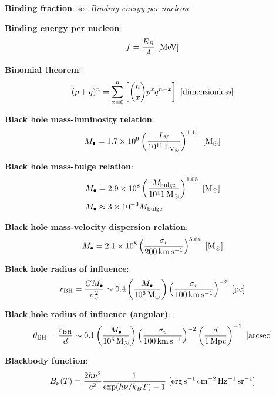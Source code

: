 \documentclass[a4paper,10pt]{article}
\begin{document}
{\noindent}\textbf{Binding fraction}: see \textit{Binding energy per nucleon}

{\noindent}\textbf{Binding energy per nucleon}:
\begin{align*}
    f = \frac{E_B}{A} ~ [{\rm MeV}]
\end{align*}

{\noindent}\textbf{Binomial theorem}:
\begin{align*}
    (p+q)^n = \sum _{x=0}^n \left[ \binom{n}{x}p^xq^{n-x} \right] ~ [{\rm dimensionless}]
\end{align*}

{\noindent}\textbf{Black hole mass-luminosity relation}:
\begin{align*}
    M_\bullet = 1.7\times10^9\left(\frac{L_\mathrm{V}}{10^{11}\,{\rm L_{V_\odot}}}\right)^{1.11} ~ [{\rm M_\odot}]
\end{align*}

{\noindent}\textbf{Black hole mass-bulge relation}:
\begin{align*}
    M_\bullet &= 2.9\times10^8\left(\frac{M_\mathrm{bulge}}{10^11\,{\rm M_\odot}}\right)^{1.05} ~ [{\rm M_\odot}] \\
    M_\bullet &\approx 3\times10^{-3}M_\mathrm{bulge}
\end{align*}

{\noindent}\textbf{Black hole mass-velocity dispersion relation}:
\begin{align*}
    M_\bullet = 2.1\times 10^8\left(\frac{\sigma_v}{200\,{\rm km\,s^{-1}}}\right)^{5.64} ~ [{\rm M_\odot}]
\end{align*}

{\noindent}\textbf{Black hole radius of influence}:
\begin{align*}
    r_\mathrm{BH} = \frac{GM_\bullet}{\sigma_v^2} \sim 0.4\left(\frac{M_\bullet}{10^6\,{\rm M_\odot}}\right)\left(\frac{\sigma_v}{100\,{\rm km\,s^{-1}}}\right)^{-2} ~ [{\rm pc}]
\end{align*}

{\noindent}\textbf{Black hole radius of influence (angular)}:
\begin{align*}
    \theta_\mathrm{BH} = \frac{r_\mathrm{BH}}{d} \sim 0.1\left(\frac{M_\bullet}{10^6\,{\rm M_\odot}}\right) \left(\frac{\sigma_v}{100\,{\rm km\,s^{-1}}}\right)^{-2} \left(\frac{d}{1\,{\rm Mpc}}\right)^{-1} ~ [{\rm arcsec}]
\end{align*}

{\noindent}\textbf{Blackbody function}:
\begin{align*}
    B_\nu(T) = \frac{2h\nu^2}{c^2} \frac{1}{\exp(h\nu/k_BT) - 1} ~ [{\rm erg\,s^{-1}\,cm^{-2}\,Hz^{-1}\,sr^{-1}}]
\end{align*}
\end{document}
